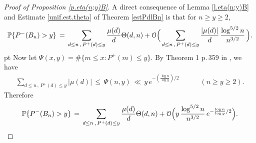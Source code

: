 \documentclass[11pt,draft,reqno]{amsart}
\theoremstyle{definition}
\theoremstyle{remarks}
\numberwithin{equation}{section}
\def \g{{\gamma}}
\def \p{{\varphi}}
\def \m{{\mu}}
\def \qq{{\qquad}}
\def\P{{\mathcal P}}
\def\P{{\mathbb P}}
\begin{document}
\begin{proof}[Proof of Proposition \ref{p.eta(n;y)B}] A direct consequence of  Lemma \ref{l.eta(n;y)B} and Estimate  \eqref{unif.est.theta} of  Theorem \ref{estPdlBn} is  that for $n\ge y\ge 2$,
 \begin{equation*} \P\{P^-(B_n )> y\} \,=\,  \sum_{ d\le n\,,\, P^+(d )\le y}{  \m(d)\over d}\Theta(d,n)+ {\mathcal O}\Big(\sum_{ d\le n\,,\, P^+(d )\le y}{ | \m(d)|\over d}\,{ \log^{5/2} n  \over n^{ 3/2}}\, 
  \Big).
\end{equation*} 
 pt Now let $\Psi(x,y)= \#\{m\le x:P^+(m)\le y\}$. By Theorem 1 p.\,359 in \cite{Te1}, we have 
\begin{eqnarray*}
\sum_{ d\le n\,,\, P^+(d )\le y} |\m(d)|\,\le \, \Psi (n,y) \,\ll \, y\,e^{-(\frac{\log n}{\log y})/2}\qq \quad (n\ge y\ge 2).\end{eqnarray*}
Therefore 
\begin{equation*} \P\{P^-(B_n )> y\} \,=\,  \sum_{ d\le n\,,\, P^+(d )\le y}{  \m(d)\over d}\Theta(d,n)+ {\mathcal O}\Big(y\,{ \log^{5/2} n  \over n^{ 3/2}}\, 
e^{-\frac{\log n}{\log y}/2 }
\Big).
\end{equation*} 

 





\end{proof}
\end{document}
